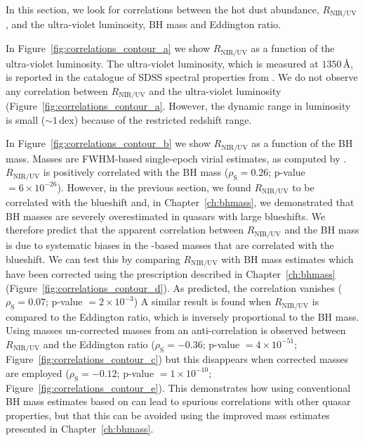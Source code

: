 In this section, we look for correlations between the hot dust abundance, $R_{\text{NIR/UV}}$, and the ultra-violet luminosity, BH mass and Eddington ratio. 

In Figure~\ref{fig:correlations_contour_a} we show $R_{\text{NIR/UV}}$ as a function of the ultra-violet luminosity. 
The ultra-violet luminosity, which is measured at $1350$\,\AA, is reported in the catalogue of SDSS spectral properties from \citet{shen11}. 
We do not observe any correlation between $R_{\text{NIR/UV}}$ and the ultra-violet luminosity (Figure~\ref{fig:correlations_contour_a}. 
However, the dynamic range in luminosity is small ($\sim1$\,dex) because of the restricted redshift range. 

In Figure~\ref{fig:correlations_contour_b} we show $R_{\text{NIR/UV}}$ as a function of the BH mass. 
Masses are  FWHM-based single-epoch virial estimates, as computed by \citet{shen11}. 
$R_{\text{NIR/UV}}$ is positively correlated with the BH mass ($\rho_{\text{S}} = 0.26$; p-value $=6\times10^{-26
}$). 
However, in the previous section, we found $R_{\text{NIR/UV}}$ to be correlated with the  blueshift and, in Chapter~\ref{ch:bhmass}, we demonstrated that BH masses are severely overestimated in quasars with large  blueshifts.
We therefore predict that the apparent correlation between $R_{\text{NIR/UV}}$ and the BH mass is due to systematic biases in the -based masses that are correlated with the  blueshift. 
We can test this by comparing $R_{\text{NIR/UV}}$ with BH mass estimates which have been corrected using the prescription described in Chapter~\ref{ch:bhmass} (Figure~\ref{fig:correlations_contour_d}). 
As predicted, the correlation vanishes ($\rho_{\text{S}}=0.07$; p-value $=2\times10^{-3}$)
A similar result is found when $R_{\text{NIR/UV}}$ is compared to the Eddington ratio, which is inversely proportional to the BH mass.  
Using masses un-corrected masses from \citet{shen11} an anti-correlation is observed between $R_{\text{NIR/UV}}$ and the Eddington ratio ($\rho_{\text{S}}=-0.36$; p-value $=4\times10^{-51}$; Figure~\ref{fig:correlations_contour_c}) but this disappears when corrected masses are employed ($\rho_{\text{S}}=-0.12$; p-value $=1\times10^{-10}$; Figure~\ref{fig:correlations_contour_e}). 
This demonstrates how using conventional BH mass estimates based on  can lead to spurious correlations with other quasar properties, but that this can be avoided using the improved mass estimates presented in Chapter~\ref{ch:bhmass}. 

